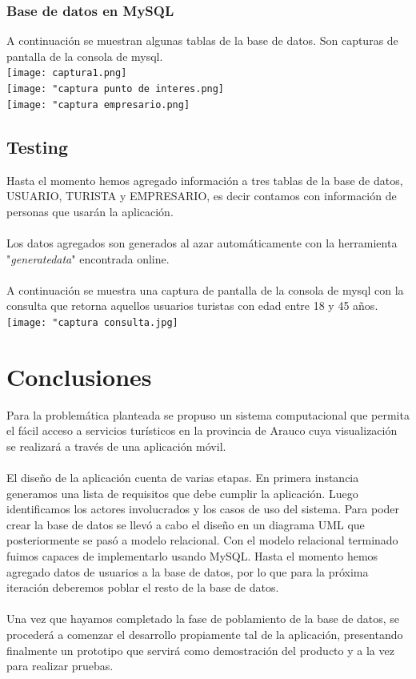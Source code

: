 \documentclass[12pt]{article}
\begin{document}
\subsubsection{Base de datos en MySQL}
A continuación se muestran algunas tablas de la base de datos. Son capturas de pantalla de la consola de mysql.\\
\texttt{[image: captura1.png]}\\ \texttt{[image: "captura punto de interes.png]}\\
\texttt{[image: "captura empresario.png]}
\subsection{Testing}
Hasta el momento hemos agregado información a tres tablas de la base de datos, USUARIO, TURISTA y EMPRESARIO, es decir contamos con información de personas que usarán la aplicación.\\\\
Los datos agregados son generados al azar automáticamente con la herramienta "\emph{generatedata}" encontrada online.\\\\
A continuación se muestra una captura de pantalla de la consola de mysql con la consulta que retorna aquellos usuarios turistas con edad entre 18 y 45 años.\\
\texttt{[image: "captura consulta.jpg]}
\section{Conclusiones}
Para la problemática planteada se propuso un sistema computacional que permita el fácil acceso a servicios turísticos en la provincia de Arauco cuya visualización se realizará a través de una aplicación móvil.\\\\
El diseño de la aplicación cuenta de varias etapas. En primera instancia generamos una lista de requisitos que debe cumplir la aplicación. Luego identificamos los actores involucrados y los casos de uso del sistema. Para poder crear la base de datos se llevó a cabo el diseño en un diagrama UML que posteriormente se pasó a modelo relacional. Con el modelo relacional terminado fuimos capaces de implementarlo usando MySQL. Hasta el momento hemos agregado datos de usuarios a la base de datos, por lo que para la próxima iteración deberemos poblar el resto de la base de datos.\\\\
Una vez que hayamos completado la fase de poblamiento de la base de datos, se procederá a comenzar el desarrollo propiamente tal de la aplicación, presentando finalmente un prototipo que servirá como demostración del producto y a la vez para realizar pruebas.
\end{document}

